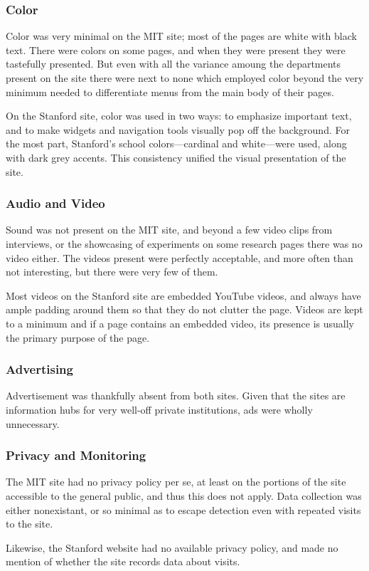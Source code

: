 \subsubsection*{Color}

Color was very minimal on the MIT site; most of the pages are white with black text. There
were colors on some pages, and when they were present they were tastefully presented. But
even with all the variance amoung the departments present on the site there were next to none
which employed color beyond the very minimum needed to differentiate menus from the main
body of their pages.

On the Stanford site, color was used in two ways: to emphasize important text,
and to make widgets and navigation tools visually pop off the background.
For the most part, Stanford's school colors---cardinal and white---were used,
along with dark grey accents. This consistency unified the visual presentation
of the site.

\subsubsection*{Audio and Video}

Sound was not present on the MIT site, and beyond a few video clips from interviews, or the
showcasing of experiments on some research pages there was no video either. The videos
present were perfectly acceptable, and more often than not interesting, but there were very
few of them.

Most videos on the Stanford site are embedded YouTube videos, and always have ample
padding around them so that they do not clutter the page. Videos are kept to a
minimum and if a page contains an embedded video, its presence is usually the
primary purpose of the page.

\subsubsection*{Advertising}

Advertisement was thankfully absent from both sites. Given that the sites are information hubs
for very well-off private institutions, ads were wholly unnecessary.

\subsubsection*{Privacy and Monitoring}

The MIT site had no privacy policy per se, at least on the portions of the site accessible to the
general public, and thus this does not apply. Data collection was either nonexistant, or so
minimal as to escape detection even with repeated visits to the site.

Likewise, the Stanford website had no available privacy policy, and made no mention
of whether the site records data about visits.
